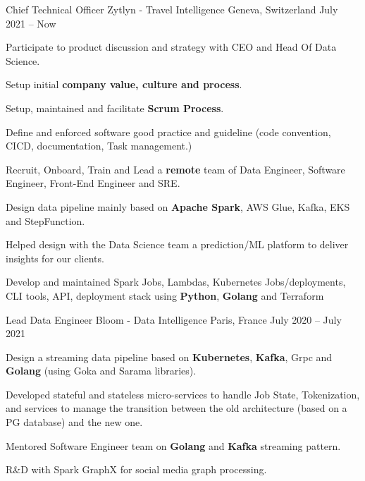 

\begin{cventries}

\cventry
  {Chief Technical Officer} %
  {Zytlyn - Travel Intelligence} %
  {Geneva, Switzerland} %
  {July 2021 – Now} %
  {
    \begin{cvitems} %
      \item {Participate to product discussion and strategy with CEO and Head Of Data Science.}
      \item {Setup initial \textbf{company value, culture and process}.}
      \item {Setup, maintained and facilitate \textbf{Scrum Process}.}
      \item {Define and enforced software good practice and guideline (code convention, CICD, documentation, Task management.)}
      \item {Recruit, Onboard, Train and Lead a \textbf{remote} team of Data Engineer, Software Engineer, Front-End Engineer and SRE.}
      \item {Design data pipeline mainly based on \textbf{Apache Spark}, AWS Glue, Kafka, EKS and StepFunction.}
      \item {Helped design with the Data Science team a prediction/ML platform to deliver insights for our clients.}
      \item {Develop and maintained Spark Jobs, Lambdas, Kubernetes Jobs/deployments, CLI tools, API, deployment stack using \textbf{Python}, \textbf{Golang} and Terraform}
    \end{cvitems}
  }

\cventry
  {Lead Data Engineer} %
  {Bloom - Data Intelligence} %
  {Paris, France} %
  {July 2020 – July 2021} %
  {
    \begin{cvitems} %
      \item {Design a streaming data pipeline based on \textbf{Kubernetes}, \textbf{Kafka}, Grpc and \textbf{Golang} (using Goka and Sarama libraries).}
      \item {Developed stateful and stateless micro-services to handle Job State, Tokenization, and services to manage the transition between the old architecture (based on a PG database) and the new one.}
      \item {Mentored Software Engineer team on \textbf{Golang} and \textbf{Kafka} streaming pattern.}
      \item {R\&D with Spark GraphX for social media graph processing.}
    \end{cvitems}
  }


\end{cventries}

